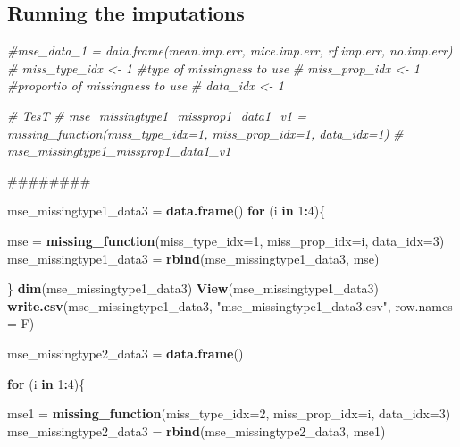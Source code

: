 \documentclass[]{article}
\newenvironment{Shaded}{\begin{snugshade}}{\end{snugshade}}
\newcommand{\KeywordTok}[1]{\textcolor[rgb]{0.13,0.29,0.53}{\textbf{#1}}}
\newcommand{\DataTypeTok}[1]{\textcolor[rgb]{0.13,0.29,0.53}{#1}}
\newcommand{\DecValTok}[1]{\textcolor[rgb]{0.00,0.00,0.81}{#1}}
\newcommand{\StringTok}[1]{\textcolor[rgb]{0.31,0.60,0.02}{#1}}
\newcommand{\CommentTok}[1]{\textcolor[rgb]{0.56,0.35,0.01}{\textit{#1}}}
\newcommand{\ControlFlowTok}[1]{\textcolor[rgb]{0.13,0.29,0.53}{\textbf{#1}}}
\newcommand{\OperatorTok}[1]{\textcolor[rgb]{0.81,0.36,0.00}{\textbf{#1}}}
\newcommand{\NormalTok}[1]{#1}
\begin{document}
\subsection{Running the imputations}\label{running-the-imputations}

\begin{Shaded}
\begin{Highlighting}[]
\CommentTok{#mse_data_1 = data.frame(mean.imp.err, mice.imp.err, rf.imp.err, no.imp.err)}
\CommentTok{# miss_type_idx <- 1 #type of missingness to use}
\CommentTok{# miss_prop_idx <- 1 #proportio of missingness to use}
\CommentTok{# data_idx <- 1}

\CommentTok{# TesT}
\CommentTok{# mse_missingtype1_missprop1_data1_v1 = missing_function(miss_type_idx=1, miss_prop_idx=1, data_idx=1)}
\CommentTok{# mse_missingtype1_missprop1_data1_v1}



\NormalTok{########}

\NormalTok{mse_missingtype1_data3 =}\StringTok{ }\KeywordTok{data.frame}\NormalTok{()}
\ControlFlowTok{for}\NormalTok{ (i }\ControlFlowTok{in} \DecValTok{1}\OperatorTok{:}\DecValTok{4}\NormalTok{)\{}
  
\NormalTok{  mse =}\StringTok{ }\KeywordTok{missing_function}\NormalTok{(}\DataTypeTok{miss_type_idx=}\DecValTok{1}\NormalTok{, }\DataTypeTok{miss_prop_idx=}\NormalTok{i, }\DataTypeTok{data_idx=}\DecValTok{3}\NormalTok{)}
\NormalTok{  mse_missingtype1_data3 =}\StringTok{ }\KeywordTok{rbind}\NormalTok{(mse_missingtype1_data3, mse)}
  
\NormalTok{\}}
\KeywordTok{dim}\NormalTok{(mse_missingtype1_data3)}
\KeywordTok{View}\NormalTok{(mse_missingtype1_data3)}
\KeywordTok{write.csv}\NormalTok{(mse_missingtype1_data3, }\StringTok{"mse_missingtype1_data3.csv"}\NormalTok{, }\DataTypeTok{row.names =}\NormalTok{ F)}

\NormalTok{mse_missingtype2_data3 =}\StringTok{ }\KeywordTok{data.frame}\NormalTok{()}

\ControlFlowTok{for}\NormalTok{ (i }\ControlFlowTok{in} \DecValTok{1}\OperatorTok{:}\DecValTok{4}\NormalTok{)\{}
  
\NormalTok{  mse1 =}\StringTok{ }\KeywordTok{missing_function}\NormalTok{(}\DataTypeTok{miss_type_idx=}\DecValTok{2}\NormalTok{, }\DataTypeTok{miss_prop_idx=}\NormalTok{i, }\DataTypeTok{data_idx=}\DecValTok{3}\NormalTok{)}
\NormalTok{  mse_missingtype2_data3 =}\StringTok{ }\KeywordTok{rbind}\NormalTok{(mse_missingtype2_data3, mse1)}
  

\end{Highlighting}
\end{Shaded}
\end{document}
